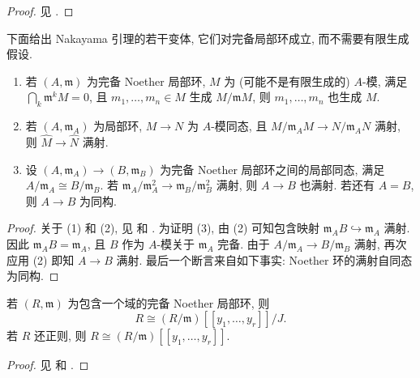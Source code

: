 \begin{proof}
见 \cite[命题 $10.13$--$10.16$]{AM69}.
\end{proof}
下面给出 Nakayama 引理的若干变体, 它们对完备局部环成立, 而不需要有限生成假设.
\begin{lemma}[完备 Nakayama 引理]\label{src:B.5.6}
\begin{enumerate}[(1)]
\item 若 $(A,\mathfrak m)$ 为完备 Noether 局部环, $M$ 为 (可能不是有限生成的) $A$-模, 满足 $\bigcap_k\mathfrak m^kM=0$, 且 $m_1,\ldots,m_n\in M$ 生成 $M/\mathfrak mM$, 则 $m_1,\ldots,m_n$ 也生成 $M$.
\item 若 $(A,\mathfrak m_A)$ 为局部环, $M\to N$ 为 $A$-模同态, 且 $M/\mathfrak m_AM\to N/\mathfrak m_AN$ 满射, 则 $\widehat M\to\widehat N$ 满射.
\item 设 $(A,\mathfrak m_A)\to(B,\mathfrak m_B)$ 为完备 Noether 局部环之间的局部同态, 满足 $A/\mathfrak m_A\cong B/\mathfrak m_B$. 若 $\mathfrak m_A/\mathfrak m_A^2\to\mathfrak m_B/\mathfrak m_B^2$ 满射, 则 $A\to B$ 也满射. 若还有 $A=B$, 则 $A\to B$ 为同构.
\end{enumerate}
\end{lemma}
\begin{proof}
关于 (1) 和 (2), 见 \cite[习题 $7.2$]{Eis95} 和 \cite[Tag 0315]{SP}. 为证明 (3), 由 (2) 可知包含映射 $\mathfrak m_AB\hookrightarrow\mathfrak m_A$ 满射. 因此 $\mathfrak m_AB=\mathfrak m_A$, 且 $B$ 作为 $A$-模关于 $\mathfrak m_A$ 完备. 由于 $A/\mathfrak m_A\to B/\mathfrak m_B$ 满射, 再次应用 (2) 即知 $A\to B$ 满射. 最后一个断言来自如下事实: Noether 环的满射自同态为同构.
\end{proof}
\begin{theorem}\label{src:B.5.7}
若 $(R,\mathfrak m)$ 为包含一个域的完备 Noether 局部环, 则
\[
R\cong(R/\mathfrak m)[[y_1,\ldots,y_r]]/J.
\]
若 $R$ 还正则, 则 $R\cong(R/\mathfrak m)[[y_1,\ldots,y_r]]$.
\end{theorem}
\begin{proof}
见 \cite[定理 $7.7$]{Eis95} 和 \cite[Tags 032A 及 0C0S]{SP}.
\end{proof}

